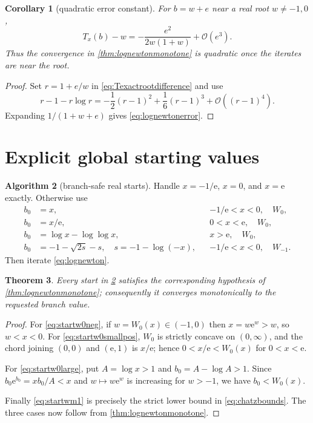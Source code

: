 \documentclass[11pt,oneside]{book}
\newtheorem{theorem}{Theorem}[chapter]
\newtheorem{corollary}[theorem]{Corollary}
\theoremstyle{definition}
\newtheorem{algorithm}[theorem]{Algorithm}
\theoremstyle{remark}
\newcommand{\ee}{\mathrm e}
\newcommand{\bigO}{\mathcal O}
\begin{document}
\begin{corollary}[quadratic error constant]\label{cor:lognewtonquadratic}
For $b=w+e$ near a real root $w\ne-1,0$,
\begin{equation}\label{eq:lognewtonerror}
 T_x(b)-w
 =-\frac{e^2}{2w(1+w)}+\bigO(e^3).
\end{equation}
Thus the convergence in \cref{thm:lognewtonmonotone} is quadratic once the
iterates are near the root.
\end{corollary}

\begin{proof}
Set $r=1+e/w$ in \eqref{eq:Texactrootdifference} and use
\[
 r-1-r\log r=-\frac12(r-1)^2+\frac16(r-1)^3+\bigO((r-1)^4).
\]
Expanding $1/(1+w+e)$ gives \eqref{eq:lognewtonerror}.
\end{proof}

\section{Explicit global starting values}

\begin{algorithm}[branch-safe real starts]\label{alg:realstarts}
Handle $x=-1/\ee$, $x=0$, and $x=\ee$ exactly.  Otherwise use
\begin{align}
 b_0&=x,
 &&-1/\ee<x<0,\quad W_0,\label{eq:startw0neg}\\
 b_0&=x/\ee,
 &&0<x<\ee,\quad W_0,\label{eq:startw0smallpos}\\
 b_0&=\log x-\log\log x,
 &&x>\ee,\quad W_0,\label{eq:startw0large}\\
 b_0&=-1-\sqrt{2s}-s,
 \quad s=-1-\log(-x),
 &&-1/\ee<x<0,\quad W_{-1}.
 \label{eq:startwm1}
\end{align}
Then iterate \eqref{eq:lognewton}.
\end{algorithm}

\begin{theorem}\label{thm:startsvalid}
Every start in \cref{alg:realstarts} satisfies the corresponding hypothesis
of \cref{thm:lognewtonmonotone}; consequently it converges monotonically to
the requested branch value.
\end{theorem}

\begin{proof}
For \eqref{eq:startw0neg}, if $w=W_0(x)\in(-1,0)$ then
$x=w\ee^w>w$, so $w<x<0$.  For \eqref{eq:startw0smallpos}, $W_0$ is strictly
concave on $(0,\infty)$, and the chord joining $(0,0)$ and $(\ee,1)$ is
$x/\ee$; hence $0<x/\ee<W_0(x)$ for $0<x<\ee$.

For \eqref{eq:startw0large}, put $A=\log x>1$ and
$b_0=A-\log A>1$.  Since
$b_0\ee^{b_0}=x b_0/A<x$ and $w\mapsto w\ee^w$ is increasing for $w>-1$,
we have $b_0<W_0(x)$.

Finally \eqref{eq:startwm1} is precisely the strict lower bound in
\eqref{eq:chatzbounds}.  The three cases now follow from
\cref{thm:lognewtonmonotone}.
\end{proof}
\end{document}
